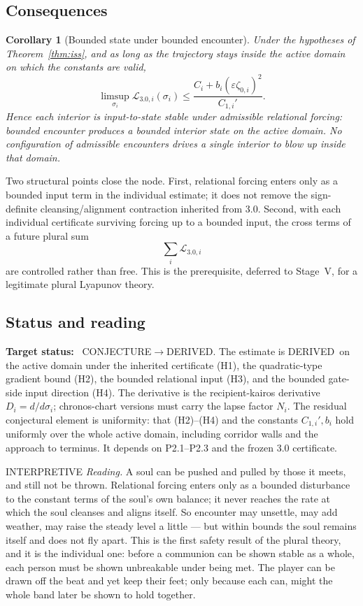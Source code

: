 \documentclass[11pt,a4paper]{article}
\newcommand{\stDerived}{\textcolor{cDer}{\textsf{\small DERIVED}}}
\newcommand{\stInterp}{\textcolor{cInt}{\textsf{\small INTERPRETIVE}}}
\newcommand{\stConj}{\textcolor{cCon}{\textsf{\small CONJECTURE}}}
\theoremstyle{definition}
\theoremstyle{plain}
\newtheorem{corollary}[definition]{Corollary}
\theoremstyle{remark}
\begin{document}
\subsection{Consequences}

\begin{corollary}[Bounded state under bounded encounter]\label{cor:bddstate}
Under the hypotheses of Theorem~\ref{thm:iss}, and as long as the trajectory stays
inside the active domain on which the constants are valid,
\[
\limsup_{\sigma_i}
\mathcal L_{3.0,i}(\sigma_i)
\le
\frac{
C_i+b_i(\varepsilon\zeta_{0,i})^2
}{
C_{1,i}'
}.
\]
Hence each interior is input-to-state stable under admissible relational forcing:
bounded encounter produces a bounded interior state on the active domain. No
configuration of admissible encounters drives a single interior to blow up inside
that domain.
\end{corollary}

Two structural points close the node. First, relational forcing enters only as a
bounded input term in the individual estimate; it does not remove the
sign-definite cleansing/alignment contraction inherited from 3.0. Second, with
each individual certificate surviving forcing up to a bounded input, the cross
terms of a future plural sum
\[
\sum_i\mathcal L_{3.0,i}
\]
are controlled rather than free. This is the prerequisite, deferred to Stage~V, for
a legitimate plural Lyapunov theory.

\subsection{Status and reading}

\textbf{Target status:}~
\stConj\(\to\)\stDerived. The estimate is \stDerived\ on the active domain under
the inherited certificate (H1), the quadratic-type gradient bound (H2), the bounded
relational input (H3), and the bounded gate-side input direction (H4). The
derivative is the recipient-kairos derivative \(D_i=d/d\sigma_i\); chronos-chart
versions must carry the lapse factor \(N_i\). The residual conjectural element is
uniformity: that (H2)--(H4) and the constants \(C_{1,i}',b_i\) hold uniformly over
the whole active domain, including corridor walls and the approach to terminus.
It depends on P2.1--P2.3 and the frozen 3.0 certificate.

\medskip
\stInterp\quad
\emph{Reading.}
A soul can be pushed and pulled by those it meets, and still not be thrown. Relational
forcing enters only as a bounded disturbance to the constant terms of the soul's own
balance; it never reaches the rate at which the soul cleanses and aligns itself. So
encounter may unsettle, may add weather, may raise the steady level a little --- but within
bounds the soul remains itself and does not fly apart. This is the first safety result of
the plural theory, and it is the individual one: before a communion can be shown stable as a
whole, each person must be shown unbreakable under being met. The player can be drawn off the
beat and yet keep their feet; only because each can, might the whole band later be shown to
hold together.
\end{document}
